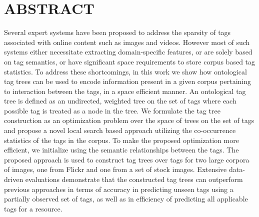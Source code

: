 

\section{ABSTRACT}

Several expert systems have been proposed to address the sparsity of tags associated with online content such as images and videos. However most of such systems either necessitate extracting domain-specific features, or are solely based on tag semantics, or have significant space requirements to store corpus based tag statistics. To address these shortcomings, in this work we show how ontological tag trees can be used to encode information present in a given corpus pertaining to interaction between the tags, in a space efficient manner. An ontological tag tree is defined as an undirected, weighted tree on the set of tags where each possible tag is treated as a node in the tree. We formulate the tag tree construction as an optimization problem over the space of trees on the set of tags and propose a novel local search based approach utilizing the co-occurrence statistics of the tags in the corpus. To make the proposed optimization more efficient, we initialize using the semantic relationships between the tags. The proposed approach is used to construct tag trees over tags for two large corpora of images, one from Flickr and one from a set of stock images. Extensive data-driven evaluations demonstrate that the constructed tag trees can outperform previous approaches in terms of accuracy in predicting unseen tags using a partially observed set of tags, as well as in efficiency of predicting all applicable tags for a resource. 









